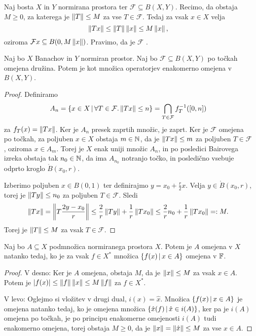 Naj bosta $X$ in $Y$ normirana prostora ter $\mathcal{F} \subseteq B(X,Y)$.
Recimo, da obstaja $M \ge 0$, za katerega je $\left\lVert T\right\rVert \le M$ za vse $T \in
\mathcal{F}$.
Tedaj za vsak $x \in X$ velja
\[
  \left\lVert Tx\right\rVert \le \left\lVert T\right\rVert \left\lVert x\right\rVert \le M \left\lVert x\right\rVert,
\]
oziroma $\mathcal{F}x \subseteq B(0, M \left\lVert x\right\rVert)$.
Pravimo, da je $\mathcal{F}$ .

\begin{izrek}
  Naj bo $X$ Banachov in $Y$ normiran prostor.
  Naj bo $\mathcal{F} \subseteq B(X,Y)$ po točkah omejena družina.
  Potem je kot množica operatorjev enakomerno omejena v $B(X,Y)$.
\end{izrek}

\begin{proof}
  Definiramo
  \[
	A_n = \{ x \in X \,|\, \forall T \in \mathcal{F} . \left\lVert Tx\right\rVert \le n \}
	= \bigcap_{T \in \mathcal{F}} f_T^{-1}([0,n])
  \]
  za $f_T(x) = \left\lVert Tx\right\rVert$.
  Ker je $A_n$ presek zaprtih množic, je zaprt.
  Ker je $\mathcal{F}$ omejena po točkah, za poljuben $x \in X$ obstaja $m \in
  \mathbb{N}$, da je $\left\lVert Tx\right\rVert \le m$ za poljuben $T \in \mathcal{F}$, oziroma $x \in
  A_m$.
  Torej je $X$ enak uniji množic $A_n$, in po posledici Bairovega izreka obstaja
  tak $n_0 \in \mathbb{N}$, da ima $A_{n_0}$ notranjo točko, in posledično vsebuje
  odprto kroglo $\mathring{B}(x_0, r)$.

  Izberimo poljuben $x \in B(0,1)$ ter definirajmo $y = x_0 + \frac{r}{2} x$.
  Velja $y \in \mathring{B}(x_0, r)$, torej je $\left\lVert Ty\right\rVert \le n_0$ za poljuben
  $T \in \mathcal{F}$.
  Sledi
  \[
	\left\lVert Tx\right\rVert = \left\lVert T \frac{2y - x_0}{r}\right\rVert
	\le \frac{2}{r} \left\lVert Ty\right\rVert + \frac{1}{r} \left\lVert T x_0\right\rVert
	\le \frac{2}{r} n_0 + \frac{1}{r} \left\lVert T x_0\right\rVert
	=: M.
  \]
  Torej je $\left\lVert T\right\rVert \le M$ za vsak $T \in \mathcal{F}$.
\end{proof}

\begin{izrek}
  Naj bo $A \subseteq X$ podmnožica normiranega prostora $X$.
  Potem je $A$ omejena v $X$ natanko tedaj, ko je za vsak $f \in X^*$ množica
  $\{f(x) \,|\, x \in A\}$ omejena v $\mathbb{F}$.
\end{izrek}

\begin{proof}
  V desno:
  Ker je $A$ omejena, obstaja $M$, da je $\left\lVert x\right\rVert \le M$ za vsak $x \in A$.
  Potem je $\left| f(x) \right| \le \left\lVert f\right\rVert \left\lVert x\right\rVert \le M \left\lVert f\right\rVert$ za $f \in X^*$.

  V levo:
  Oglejmo si vložitev v drugi dual, $i(x) = \hat{x}$.
  Množica $\{f(x) \,|\, x \in A\}$ je omejena natanko tedaj, ko je omejena
  množica $\{\hat{x}(f) \,|\, \hat{x} \in i(A)\}$, ker pa je $i(A)$ omejena po
  točkah, je po principu enakomerne omejenosti $i(A)$ tudi enakomerno omejena,
  torej obstaja $M \ge 0$, da je $\left\lVert x\right\rVert = \left\lVert\hat{x}\right\rVert \le M$ za vse $x \in
  A$.
\end{proof}

